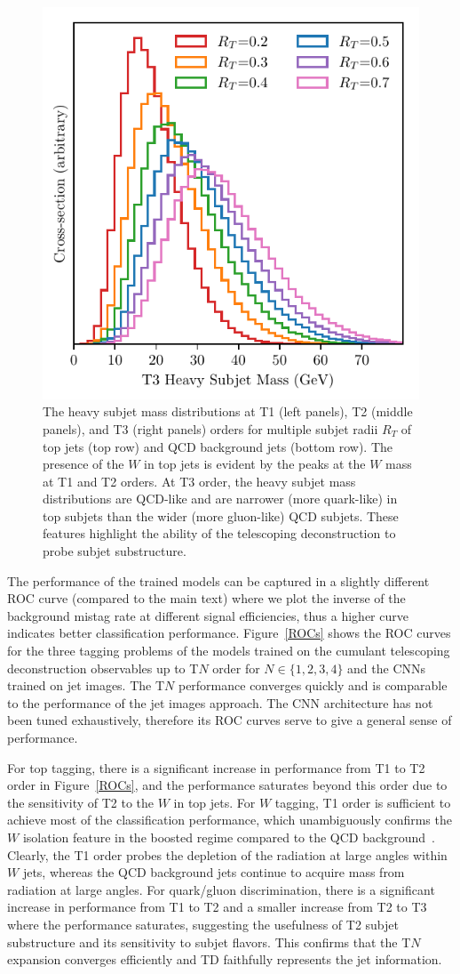 \documentclass[notoc,preprintnumbers]{JHEP3}
\begin{document}
\begin{figure}[t]
\includegraphics[width=.32\columnwidth]{figures/T3HeavyMass_qcd.pdf}
\caption{\label{masses}The heavy subjet mass distributions at T1 (left panels), T2 (middle panels), and T3 (right panels) orders for multiple subjet radii $R_T$ of top jets (top row) and QCD background jets (bottom row). The presence of the $W$ in top jets is evident by the peaks at the $W$ mass at T1 and T2 orders. At T3 order, the heavy subjet mass distributions are QCD-like and are narrower (more quark-like) in top subjets than the wider (more gluon-like) QCD subjets. These features highlight the ability of the telescoping deconstruction to probe subjet substructure.}
\end{figure}

The performance of the trained models can be captured in a slightly different ROC curve (compared to the main text) where we plot the inverse of the background mistag rate at different signal efficiencies, thus a higher curve indicates better classification performance. Figure~\ref{ROCs} shows the ROC curves for the three tagging problems of the models trained on the cumulant telescoping deconstruction observables up to T$N$ order for $N\in\{1,2,3,4\}$ and the CNNs trained on jet images. The T$N$ performance converges quickly and is comparable to the performance of the jet images approach. The CNN architecture has not been tuned exhaustively, therefore its ROC curves serve to give a general sense of performance.

For top tagging, there is a significant increase in performance from T1 to T2 order in Figure~\ref{ROCs}, and the performance saturates beyond this order due to the sensitivity of T2 to the $W$ in top jets. For $W$ tagging, T1 order is sufficient to achieve most of the classification performance, which unambiguously confirms the $W$ isolation feature in the boosted regime compared to the QCD background~\cite{Chien:2017xrb}. Clearly, the T1 order probes the depletion of the radiation at large angles within $W$ jets, whereas the QCD background jets continue to acquire mass from radiation at large angles. For quark/gluon discrimination, there is a significant increase in performance from T1 to T2 and a smaller increase from T2 to T3 where the performance saturates, suggesting the usefulness of T2 subjet substructure and its sensitivity to subjet flavors. This confirms that the T$N$ expansion converges efficiently and TD faithfully represents the jet information.
\end{document}

